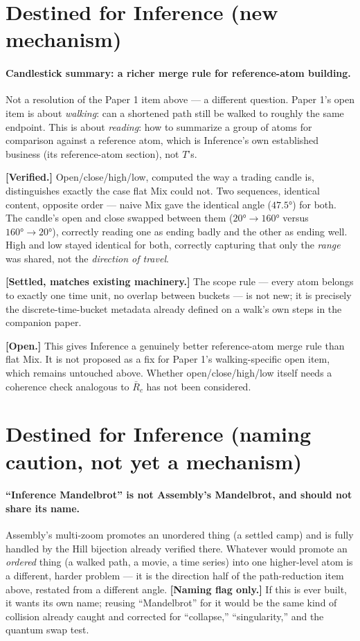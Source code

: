 \documentclass[11pt]{article}
\begin{document}
\section{Destined for Inference (new mechanism)}

\paragraph{Candlestick summary: a richer merge rule for reference-atom
building.} Not a resolution of the Paper 1 item above --- a different
question. Paper 1's open item is about \emph{walking}: can a shortened
path still be walked to roughly the same endpoint. This is about
\emph{reading}: how to summarize a group of atoms for comparison
against a reference atom, which is Inference's own established
business (its reference-atom section), not $T$'s.

\textbf{[Verified.]} Open/close/high/low, computed the way a trading
candle is, distinguishes exactly the case flat Mix could not. Two
sequences, identical content, opposite order --- naive Mix gave the
identical angle ($47.5°$) for both. The candle's open and close swapped
between them ($20°\!\to\!160°$ versus $160°\!\to\!20°$), correctly
reading one as ending badly and the other as ending well. High and low
stayed identical for both, correctly capturing that only the
\emph{range} was shared, not the \emph{direction of travel}.

\textbf{[Settled, matches existing machinery.]} The scope rule ---
every atom belongs to exactly one time unit, no overlap between
buckets --- is not new; it is precisely the discrete-time-bucket
metadata already defined on a walk's own steps in the companion paper.

\textbf{[Open.]} This gives Inference a genuinely better reference-atom
merge rule than flat Mix. It is not proposed as a fix for Paper 1's
walking-specific open item, which remains untouched above. Whether
open/close/high/low itself needs a coherence check analogous to
$\bar R_c$ has not been considered.

\section{Destined for Inference (naming caution, not yet a mechanism)}

\paragraph{``Inference Mandelbrot'' is not Assembly's Mandelbrot, and
should not share its name.} Assembly's multi-zoom promotes an
unordered thing (a settled camp) and is fully handled by the Hill
bijection already verified there. Whatever would promote an
\emph{ordered} thing (a walked path, a movie, a time series) into one
higher-level atom is a different, harder problem --- it is the
direction half of the path-reduction item above, restated from a
different angle. \textbf{[Naming flag only.]} If this is ever built,
it wants its own name; reusing ``Mandelbrot'' for it would be the same
kind of collision already caught and corrected for ``collapse,''
``singularity,'' and the quantum swap test.
\end{document}
